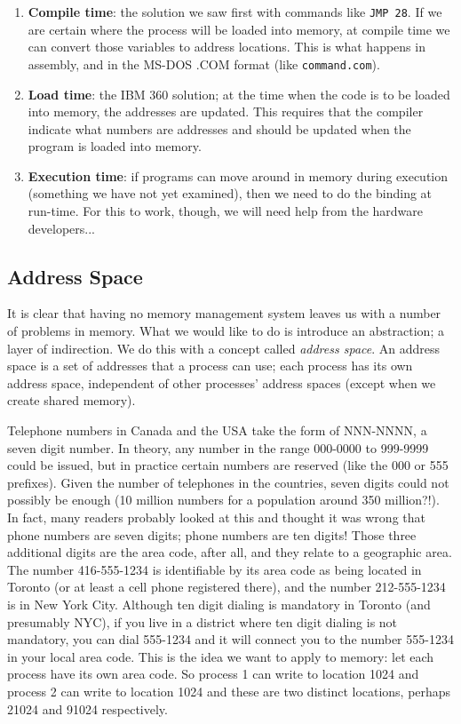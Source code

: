 \begin{enumerate}
	\item \textbf{Compile time}: the solution we saw first with commands like \texttt{JMP 28}. If we are certain where the process will be loaded into memory, at compile time we can convert those variables to address locations. This is what happens in assembly, and in the MS-DOS .COM format (like \texttt{command.com}).
	\item \textbf{Load time}: the IBM 360 solution; at the time when the code is to be loaded into memory, the addresses are updated. This requires that the compiler indicate what numbers are addresses and should be updated when the program is loaded into memory.
	\item \textbf{Execution time}: if programs can move around in memory during execution (something we have not yet examined), then we need to do the binding at run-time. For this to work, though, we will need help from the hardware developers...
\end{enumerate}

\subsection*{Address Space}
It is clear that having no memory management system leaves us with a number of problems in memory. What we would like to do is introduce an abstraction; a layer of indirection. We do this with a concept called \textit{address space}. An address space is a set of addresses that a process can use; each process has its own address space, independent of other processes' address spaces (except when we create shared memory).

Telephone numbers in Canada and the USA take the form of NNN-NNNN, a seven digit number. In theory, any number in the range 000-0000 to 999-9999 could be issued, but in practice certain numbers are reserved (like the 000 or 555 prefixes). Given the number of telephones in the countries, seven digits could not possibly be enough (10 million numbers for a population around 350 million?!). In fact, many readers probably looked at this and thought it was wrong that phone numbers are seven digits; phone numbers are ten digits! Those three additional digits are the area code, after all, and they relate to a geographic area. The number 416-555-1234 is identifiable by its area code as being located in Toronto (or at least a cell phone registered there), and the number 212-555-1234 is in New York City. Although ten digit dialing is mandatory in Toronto (and presumably NYC), if you live in a district where ten digit dialing is not mandatory, you can dial 555-1234 and it will connect you to the number 555-1234 in your local area code. This is the idea we want to apply to memory: let each process have its own area code. So process 1 can write to location 1024 and process 2 can write to location 1024 and these are two distinct locations, perhaps 21024 and 91024 respectively.

